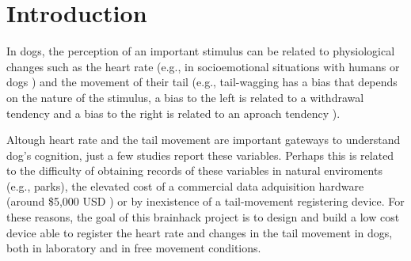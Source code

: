 \documentclass[twocolumn]{bmcart}%
\begin{document}
\begin{frontmatter}
\begin{fmbox}

	








%
\end{fmbox}%

\end{frontmatter}


\section{Introduction}\label{introduction}

In dogs, the perception of an important stimulus can be related to
physiological changes such as the heart rate (e.g., in socioemotional
situations with humans \cite{Palestrini200575} or dogs
\cite{Siniscalchi20132279} ) and the movement of their tail (e.g.,
tail-wagging has a bias that depends on the nature of the stimulus, a
bias to the left is related to a withdrawal tendency and a bias to the
right is related to an aproach tendency \cite{Quaranta2007R199} ).

Altough heart rate and the tail movement are important gateways to
understand dog's cognition, just a few studies report these variables.
Perhaps this is related to the difficulty of obtaining records of these
variables in natural enviroments (e.g., parks), the elevated cost of a
commercial data adquisition hardware (around \$5,000 USD
\cite{paragonURL} ) or by inexistence of a tail-movement registering
device. For these reasons, the goal of this brainhack project is to
design and build a low cost device able to register the heart rate and
changes in the tail movement in dogs, both in laboratory and in free
movement conditions.
\end{document}
